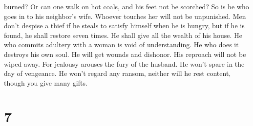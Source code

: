 burned?  Or can one walk on hot coals, and his feet not be
scorched?  So is he who goes in to his neighbor's wife.
Whoever touches her will not be unpunished.  Men don't
despise a thief if he steals to satisfy himself when he is hungry,
 but if he is found, he shall restore seven times. He shall
give all the wealth of his house.  He who commits adultery
with a woman is void of understanding. He who does it destroys his own
soul.  He will get wounds and dishonor. His reproach will
not be wiped away.  For jealousy arouses the fury of the
husband. He won't spare in the day of vengeance.  He won't
regard any ransom, neither will he rest content, though you give many
gifts.

\hypertarget{section-6}{%
\section{7}\label{section-6}}

